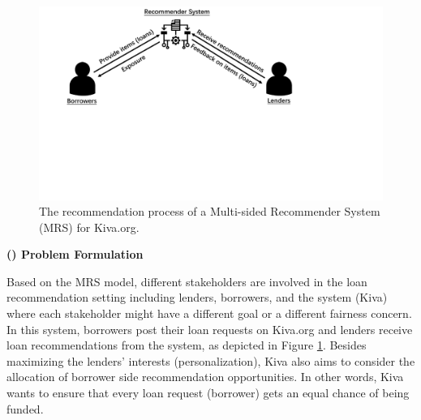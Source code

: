 \begin{figure}[t]
\includegraphics[width=0.99\columnwidth]{imgs/far/mrs.pdf}
\caption{The recommendation process of a Multi-sided Recommender System (MRS) for Kiva.org.}
\label{fig:mrs}
\end{figure}

\vspace{0.25cm}
\noindent \textbf{() Problem Formulation}
\vspace{0.25cm}

Based on the MRS model, different stakeholders are involved in the loan recommendation setting including lenders, borrowers, and the system (Kiva) where each stakeholder might have a different goal or a different fairness concern. In this system, borrowers post their loan requests on Kiva.org and lenders receive loan recommendations from the system, as depicted in Figure \ref{fig:mrs}. 
Besides maximizing the lenders' interests (personalization), Kiva also aims to consider the allocation of borrower side recommendation opportunities. In other words, Kiva wants to ensure that every loan request (borrower) gets an equal chance of being funded.



